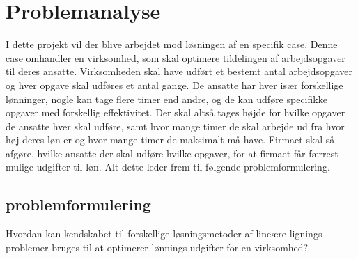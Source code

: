 \section{Problemanalyse}
I dette projekt vil der blive arbejdet mod løsningen af en specifik case. 
Denne case omhandler en virksomhed, som skal optimere tildelingen af arbejdsopgaver til deres ansatte.
Virksomheden skal have udført et bestemt antal arbejdsopgaver og hver opgave skal udføres et antal gange. 
De ansatte har hver især forskellige lønninger, nogle kan tage flere timer end andre, og de kan udføre specifikke opgaver med forskellig effektivitet.
Der skal altså tages højde for hvilke opgaver de ansatte hver skal udføre, samt hvor mange timer de skal arbejde ud fra hvor høj deres løn er og hvor mange timer de maksimalt må have.
Firmaet skal så afgøre, hvilke ansatte der skal udføre hvilke opgaver, for at firmaet får færrest mulige udgifter til løn. 
Alt dette leder frem til følgende problemformulering.

\subsection{problemformulering}
Hvordan kan kendskabet til forskellige løsningsmetoder af lineære lignings problemer bruges til at optimerer lønnings udgifter for en virksomhed?
